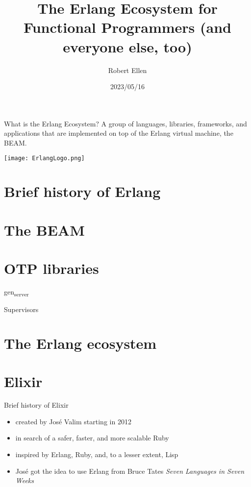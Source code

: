 \documentclass[
  ignorenonframetext,
]{beamer}
\title{The Erlang Ecosystem for Functional Programmers (and everyone
else, too)}
\author{Robert Ellen}
\date{2023/05/16}
\providecommand{\tightlist}{%
  \setlength{\itemsep}{0pt}\setlength{\parskip}{0pt}}
\begin{document}
\frame{\titlepage}

\begin{frame}{What is the Erlang Ecosystem?}
\protect\hypertarget{what-is-the-erlang-ecosystem}{}
A group of languages, libraries, frameworks, and applications that are
implemented on top of the Erlang virtual machine, the BEAM.

\texttt{[image: ErlangLogo.png]}
\end{frame}

\hypertarget{brief-history-of-erlang}{%
\section{Brief history of Erlang}\label{brief-history-of-erlang}}

\hypertarget{the-beam}{%
\section{The BEAM}\label{the-beam}}

\hypertarget{otp-libraries}{%
\section{OTP libraries}\label{otp-libraries}}

\begin{frame}{gen\textsubscript{server}}
\protect\hypertarget{genserver}{}
\end{frame}

\begin{frame}{Supervisors}
\protect\hypertarget{supervisors}{}
\end{frame}

\hypertarget{the-erlang-ecosystem}{%
\section{The Erlang ecosystem}\label{the-erlang-ecosystem}}

\hypertarget{elixir}{%
\section{Elixir}\label{elixir}}

\begin{frame}{Brief history of Elixir}
\protect\hypertarget{brief-history-of-elixir}{}
\begin{itemize}
\tightlist
\item
  created by José Valim starting in 2012
\item
  in search of a safer, faster, and more scalable Ruby
\item
  inspired by Erlang, Ruby, and, to a lesser extent, Lisp
\item
  José got the idea to use Erlang from Bruce Tate\textquotesingle s
  \emph{Seven Languages in Seven Weeks}
\end{itemize}
\end{frame}
\end{document}

